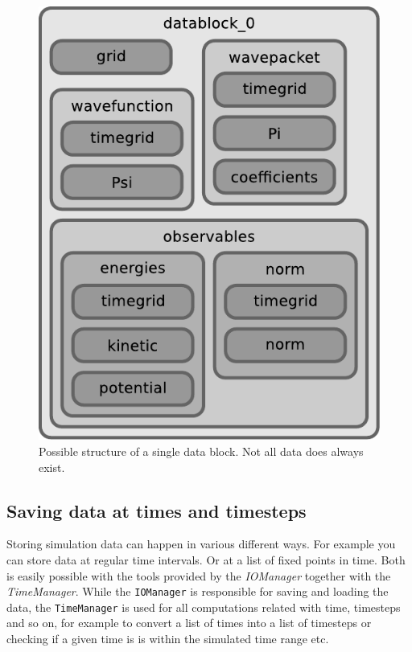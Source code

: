 \documentclass[a4paper,10pt]{report}
\begin{document}
\begin{figure}
  \centering
  \includegraphics[scale=0.75]{./fig/structure_datablock.pdf}
  \caption{Possible structure of a single data block. Not all data does always exist.}
  \label{fig:blockschema}
\end{figure}

\subsection{Saving data at times and timesteps}

Storing simulation data can happen in various different ways. For example you
can store data at regular time intervals. Or at a list of fixed points in time.
Both is easily possible with the tools provided by the \emph{IOManager} together
with the \emph{TimeManager}. While the \texttt{IOManager} is responsible for
saving and loading the data, the \texttt{TimeManager} is used for all computations
related with time, timesteps and so on, for example to convert a list of times
into a list of timesteps or checking if a given time is is within the simulated
time range etc.
\end{document}
